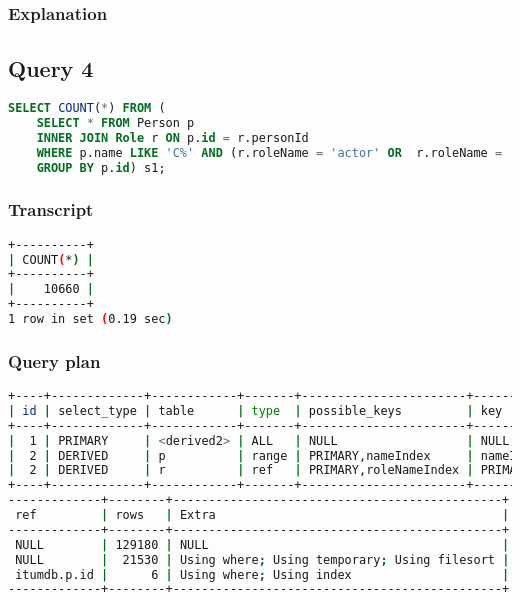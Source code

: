 \subsubsection{Explanation}


\subsection{Query 4}
\begin{lstlisting}[language=sql]
SELECT COUNT(*) FROM (
	SELECT * FROM Person p
	INNER JOIN Role r ON p.id = r.personId
	WHERE p.name LIKE 'C%' AND (r.roleName = 'actor' OR  r.roleName = 'director')
	GROUP BY p.id) s1;
\end{lstlisting}
\subsubsection{Transcript}
\begin{lstlisting}[language=bash]
+----------+
| COUNT(*) |
+----------+
|    10660 |
+----------+
1 row in set (0.19 sec)
\end{lstlisting}

\subsubsection{Query plan}
\begin{lstlisting}[language=bash]
+----+-------------+------------+-------+-----------------------+-----------+---------+
| id | select_type | table      | type  | possible_keys         | key       | key_len |
+----+-------------+------------+-------+-----------------------+-----------+---------+
|  1 | PRIMARY     | <derived2> | ALL   | NULL                  | NULL      | NULL    |
|  2 | DERIVED     | p          | range | PRIMARY,nameIndex     | nameIndex | 32      |
|  2 | DERIVED     | r          | ref   | PRIMARY,roleNameIndex | PRIMARY   | 4       |
+----+-------------+------------+-------+-----------------------+-----------+---------+
-------------+--------+----------------------------------------------+
 ref         | rows   | Extra                                        |
-------------+--------+----------------------------------------------+
 NULL        | 129180 | NULL                                         |
 NULL        |  21530 | Using where; Using temporary; Using filesort |
 itumdb.p.id |      6 | Using where; Using index                     |
-------------+--------+----------------------------------------------+
\end{lstlisting}

